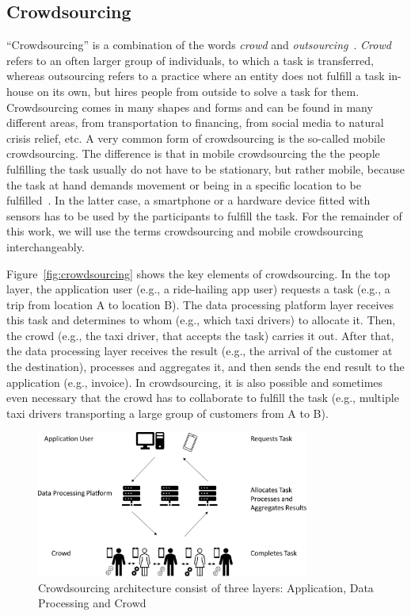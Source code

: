 \subsection*{Crowdsourcing}
``Crowdsourcing'' is a combination of the words \textit{crowd} and \textit{outsourcing}~\cite{howe2006rise}.
\textit{Crowd} refers to an often larger group of individuals, to which a task is transferred, whereas outsourcing refers to a practice where an entity does not fulfill a task in-house on its own, but hires people from outside to solve a task for them.
Crowdsourcing comes in many shapes and forms and can be found in many different areas, from transportation to financing, from social media to natural crisis relief, etc.
A very common form of crowdsourcing is the so-called mobile crowdsourcing.
The difference is that in mobile crowdsourcing the the people fulfilling the task usually do not have to be stationary, but rather mobile, because the task at hand demands movement or being in a specific location to be fulfilled~\cite{phuttharak2018review}.
In the latter case, a smartphone or a hardware device fitted with sensors has to be used by the participants to fulfill the task.
For the remainder of this work, we will use the terms crowdsourcing and mobile crowdsourcing interchangeably.

Figure~\ref{fig:crowdsourcing} shows the key elements of crowdsourcing.
In the top layer, the application user (e.g., a ride-hailing app user) requests a task (e.g., a trip from location A to location B).
The data processing platform layer receives this task and determines to whom (e.g., which taxi drivers) to allocate it.
Then, the crowd (e.g., the taxi driver, that accepts the task) carries it out.
After that, the data processing layer receives the result (e.g., the arrival of the customer at the destination), processes and aggregates it, and then sends the end result to the application (e.g., invoice).
In crowdsourcing, it is also possible and sometimes even necessary that the crowd has to collaborate to fulfill the task (e.g., multiple taxi drivers transporting a large group of customers from A to B).

\begin{figure}[htbp]
  \centering
  \includegraphics[width=0.8\textwidth]{fig/crowdsourcing.pdf}
  \caption{Crowdsourcing architecture consist of three layers: Application, Data Processing and Crowd}
\end{figure}
\label{fig:crowdsourcing}


